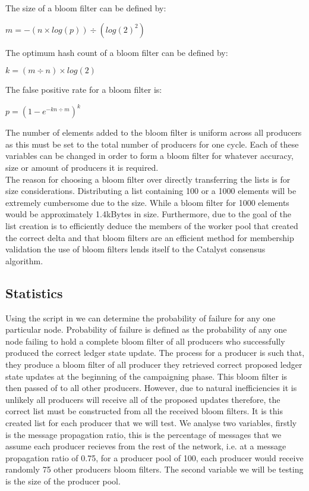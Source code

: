 The size of a bloom filter can be defined by: 

\begin{center} 
$m = -(n \times log(p)) \div (log(2)^2)$
\end{center} 

The optimum hash count of a bloom filter can be defined by:

\begin{center} 
$k = (m \div n) \times log(2)$
\end{center} 

The false positive rate for a bloom filter is: 

\begin{center} 
$p = (1 - e^{-kn \div m})^k$
\end{center} 

The number of elements added to the bloom filter is uniform across all producers as this must be set to the total number of producers for one cycle. Each of these variables can be changed in order to form a bloom filter for whatever accuracy, size or amount of producers it is required.\\

The reason for choosing a bloom filter over directly transferring the lists is for size considerations. Distributing a list containing 100 or a 1000 elements will be extremely cumbersome due to the size. While a bloom filter for 1000 elements would be approximately 1.4kBytes in size. Furthermore, due to the goal of the list creation is to efficiently deduce the members of the worker pool that created the correct delta and that bloom filters are an efficient method for membership validation the use of bloom filters lends itself to the Catalyst consensus algorithm. 

\subsection{Statistics}

Using the script in \cite{python} we can determine the probability of failure for any one particular node. Probability of failure is defined as the probability of any one node failing to hold a complete bloom filter of all producers who successfully produced the correct ledger state update. The process for a producer is such that, they produce a bloom filter of all producer they retrieved correct proposed ledger state updates at the beginning of the campaigning phase. This bloom filter is then passed of to  all other producers. However, due to natural inefficiencies it is unlikely all producers will receive all of the proposed updates therefore, the correct list must be constructed from all the received bloom filters. It is this created list for each producer that we will test. We analyse two variables, firstly is the message propagation ratio, this is the percentage of messages that we assume each producer recieves from the rest of the network, i.e. at a message propagation ratio of 0.75, for a producer pool of 100, each producer would receive randomly 75 other producers bloom filters. The second variable we will be testing is the size of the producer pool. 